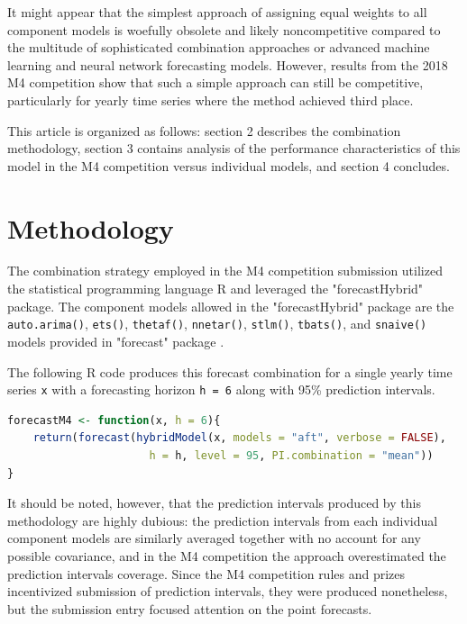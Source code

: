 \documentclass[11pt,3p,review,authoryear]{elsarticle}
\begin{document}
It might appear that the simplest approach of assigning equal weights to all component models is woefully obsolete and likely noncompetitive compared to the multitude of sophisticated combination approaches or advanced machine learning and neural network forecasting models. However, results from the 2018 M4 competition show that such a simple approach can still be competitive, particularly for yearly time series where the method achieved third place.

This article is organized as follows: section 2 describes the combination methodology, section 3 contains analysis of the performance characteristics of this model in the M4 competition versus individual models, and section 4 concludes.

\section{Methodology}
The combination strategy employed in the M4 competition submission utilized the statistical programming language R \citep{Rlang} and leveraged the "forecastHybrid" \citep{forecastHybrid} package. The component models allowed in the "forecastHybrid" package are the  \lstinline{auto.arima()}, \lstinline{ets()}, \lstinline{thetaf()}, \lstinline{nnetar()}, \lstinline{stlm()}, \lstinline{tbats()}, and \lstinline{snaive()} models provided in "forecast" package \citep{Forecast}.


The following R code produces this forecast combination for a single yearly time series \lstinline{x} with a forecasting horizon \lstinline{h = 6} along with 95\% prediction intervals.
\begin{lstlisting}[language=R]
forecastM4 <- function(x, h = 6){
    return(forecast(hybridModel(x, models = "aft", verbose = FALSE),
                      h = h, level = 95, PI.combination = "mean"))
}
\end{lstlisting}

It should be noted, however, that the prediction intervals produced by this methodology are highly dubious: the prediction intervals from each individual component models are similarly averaged together with no account for any possible covariance, and in the M4 competition the approach overestimated the prediction intervals coverage. Since the M4 competition rules and prizes incentivized submission of prediction intervals, they were produced nonetheless, but the submission entry focused attention on the point forecasts.
\end{document}

